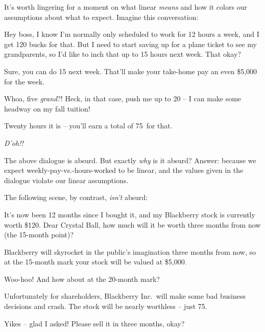 It's worth lingering for a moment on what linear \textit{means} and how it
colors our assumptions about what to expect. Imagine this conversation:

\begin{dialogue}

 Hey boss, I know I'm normally only scheduled to work for 12 hours a
week, and I get 120 bucks for that. But I need to start saving up for a plane
ticket to see my grandparents, so I'd like to inch that up to 15 hours next
week. That okay?

 Sure, you can do 15 next week. That'll make your take-home
pay an even \$5,000 for the week.

  Whoa, five \textit{grand}?! Heck, in that
case, push me up to 20 -- I can make some headway on my fall tuition!

 Twenty hours it is -- you'll earn a total of 75\textcent~for
that.

 \textit{D'oh!!}

\end{dialogue}

The above dialogue is absurd. But exactly \textit{why} is it absurd? Answer:
because we expect weekly-pay-vs.-hours-worked to be linear, and the values
given in the dialogue violate our linear assumptions.

\bigskip
The following scene, by contrast, \textit{isn't} absurd:

\begin{dialogue}

 It's now been 12 months since I bought it, and my Blackberry stock
is currently worth \$120. Dear Crystal Ball, how much will it be worth three
months from now (the 15-month point)?

 Blackberry will skyrocket in the public's imagination
three months from now, so at the 15-month mark your stock will be valued at
\$5,000.

 Woo-hoo! And how about at the 20-month mark?

 Unfortunately for shareholders, Blackberry Inc.~will make
some bad business decisions and crash. The stock will be nearly worthless --
just 75\textcent.

 Yikes -- glad I asked! Please sell it in three months, okay?

\end{dialogue}

